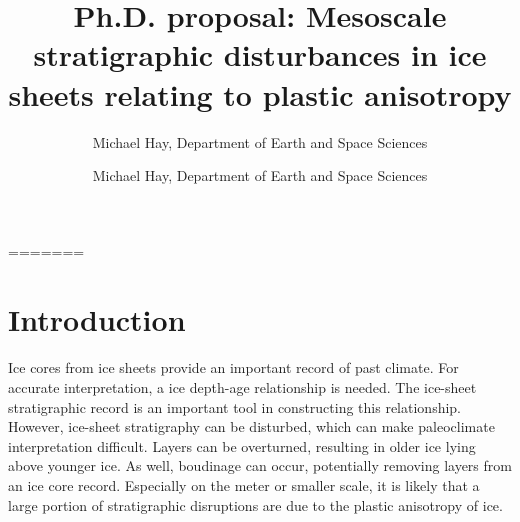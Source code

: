 \documentclass{report}
\author{Michael Hay, Department of Earth and Space Sciences}
\begin{document}
\title{Ph.D. proposal: Mesoscale stratigraphic disturbances in ice sheets relating to plastic anisotropy}

\author{Michael Hay,
Department of Earth and Space Sciences}

\maketitle 

=======
\maketitle
\section{Introduction}
Ice cores from ice sheets provide an important record of past climate.  For accurate interpretation, a ice depth-age relationship is needed. The ice-sheet stratigraphic record is an important tool in constructing this relationship. However, ice-sheet stratigraphy can be disturbed, which can make paleoclimate interpretation difficult. Layers can be overturned, resulting in older ice lying above younger ice. As well, boudinage can occur, potentially removing layers from an ice core record. Especially on the meter or smaller scale, it is likely that a large portion of stratigraphic disruptions are due to the plastic anisotropy of ice.
\end{document}
